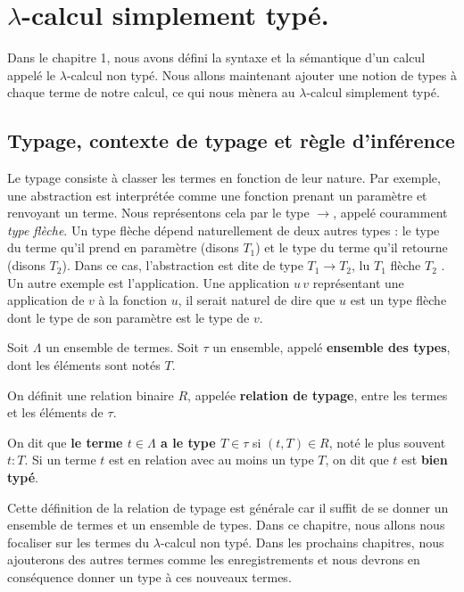 \chapter{$\lambda$-calcul simplement typé.}

Dans le chapitre 1, nous avons défini la syntaxe et la sémantique d'un calcul
appelé le $\lambda$-calcul non typé. Nous allons maintenant ajouter une notion de types à
chaque terme de notre calcul, ce qui nous mènera au $\lambda$-calcul simplement typé.

\section{Typage, contexte de typage et règle d'inférence}

Le typage consiste à classer les termes en fonction de leur nature. Par exemple,
une abstraction est interprétée comme une fonction prenant un paramètre et
renvoyant un terme. Nous représentons cela par le type $\rightarrow$, appelé
couramment \textit{type flèche}. Un type flèche dépend naturellement de deux autres types : le
type du terme qu'il prend en paramètre (disons $T_{1}$) et le type du terme
qu'il retourne (disons $T_{2}$). Dans ce cas, l'abstraction est dite de type
$T_{1} \rightarrow T_{2}$, lu \og $T_{1}$ flèche $T_{2}$ \fg. Un
autre exemple est l'application. Une application $u \, v$ représentant une
application de $v$ à la fonction $u$, il serait naturel de dire que $u$ est un
type flèche dont le type de son paramètre est le type de $v$.

\begin{definition} 
  Soit $\Lambda$ un ensemble de termes.
  Soit $\tau$ un ensemble, appelé \textbf{ensemble des types}, dont les éléments
  sont notés $T$.

  On définit une relation binaire $R$, appelée \textbf{relation de typage}, entre les
  termes et les éléments de $\tau$.
  
  On dit que \textbf{le terme $t \in \Lambda$ a le type $T \in \tau$} si $(t, T)
  \in R$, noté le plus souvent $t : T$. Si un terme $t$ est en relation avec au
  moins un type $T$, on dit que $t$ est \textbf{bien typé}.
\end{definition}

Cette définition de la relation de typage est générale car il suffit de se
donner un ensemble de termes et un ensemble de types. Dans ce chapitre, nous
allons nous focaliser sur les termes du $\lambda$-calcul non typé. Dans les
prochains chapitres, nous ajouterons des autres termes comme les enregistrements
et nous devrons en conséquence donner un type à ces nouveaux termes.


